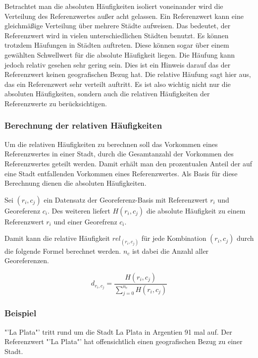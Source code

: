 			Betrachtet man die absoluten Häufigkeiten isoliert voneinander wird die Verteilung des Referenzwertes außer acht gelassen. 
			Ein Referenzwert kann eine gleichmäßige Verteilung über mehrere Städte aufweisen.
			Das bedeutet, der Referenzwert wird in vielen unterschiedlichen Städten benutzt. 
			Es können trotzdem Häufungen in Städten auftreten.
			Diese können sogar über einem gewählten Schwellwert für die absolute Häufigkeit liegen.
			Die Häufung kann jedoch relativ gesehen sehr gering sein.
			Dies ist ein Hinweis darauf das der Referenzwert keinen geografischen Bezug hat.
			Die relative Häufung sagt hier aus, das ein Referenzwert sehr verteilt auftritt. 
			Es ist also wichtig nicht nur die absoluten Häufigkeiten, sondern auch die relativen Häufigkeiten der Referenzwerte zu berücksichtigen.

			\subsubsection{Berechnung der relativen Häufigkeiten}  

				Um die relativen Häufigkeiten zu berechnen soll das Vorkommen eines Referenzwertes in einer Stadt, durch die Gesamtanzahl der Vorkommen des Referenzwertes geteilt werden.
				Damit erhält man den prozentualen Anteil der auf eine Stadt entfallenden Vorkommen eines Referenzwertes.
				Als Basis für diese Berechnung dienen die absoluten Häufigkeiten.

				Sei $(r_i,c_j)$ ein Datensatz der Georeferenz-Basis mit Referenzwert $r_i$ und Georeferenz $c_i$.
				Des weiteren liefert $H(r_{i},c_{j})$ die absolute Häufigkeit zu einem Referenzwert $r_i$ und einer Georefrenz $c_i$. 

				Damit kann die relative Häufigkeit $rel_{(r_i,c_j)}$ für jede Kombination $(r_i,c_j)$ durch die folgende Formel berechnet werden. 
				$n_c$ ist dabei die Anzahl aller Georeferenzen.

				\begin{equation}
					d_{r_i,c_j}=\frac{H(r_i,c_j)}{\sum^{n_c}_{j=0}{H(r_i,c_j)}}
				\end{equation}	

			\subsubsection{Beispiel} 

				"'La Plata"' tritt rund um die Stadt La Plata in Argentien 91 mal auf.
				Der Referenzwert "'La Plata"' hat offensichtlich einen geografischen Bezug zu einer Stadt. 

